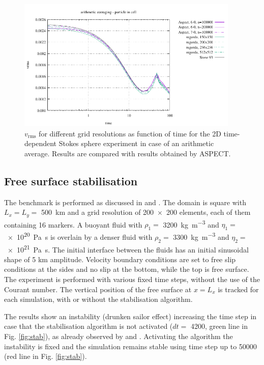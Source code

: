 \documentclass[hidelinks,10pt,a4paper]{article}
\begin{document}
\begin{figure}
\centering
\noindent\includegraphics[width=400px]{./Figures/vrms_arithm.pdf}
\caption{$v_{\textrm{rms}}$ for different grid resolutions as function of time for the 2D time-dependent Stokes sphere experiment in case of an arithmetic average.
Results are compared with results obtained by ASPECT.}
\label{fig:inst_spherefs}
\end{figure}

\subsection{Free surface stabilisation}\label{sec:stab}
The benchmark is performed as discussed in \citet{Kaus2010a} and \citet{Thieulot2014}. The domain is square with $L_x=L_y=$ \SI{500}{\km} and a grid resolution
of \num{200x200} elements, each of them containing 16 markers. A buoyant fluid with $\rho_1=$ \SI{3200}{\kg\per\cubic\metre} and $\eta_1=$ \SI{e20}{\pascal\s}
is overlain by a denser fluid with $\rho_2=$ \SI{3300}{\kg\per\cubic\metre} and $\eta_2=$ \SI{e21}{\pascal\s}. The initial interface between the fluids has an
initial sinusoidal shape of 5 km amplitude. Velocity boundary conditions are set to free slip conditions at the sides and no slip at the bottom, while the top
is free surface. The experiment is performed with various fixed time steps, without the use of the Courant number. The vertical position of the free surface at
$x=L_x$ is tracked for each simulation, with or without the stabilisation algorithm.

The results show an instability (drunken sailor effect) increasing the time step in case that the stabilisation algorithm is not activated
($dt=$ \SI{4200}{\year}, green line in Fig. \ref{fig:stab}), as already observed by \citet{Kaus2010a} and \citet{Thieulot2014}. Activating the algorithm the
instability is fixed and the simulation remains stable using time step up to \SI{50000}{\year} (red line in Fig. \ref{fig:stab}).
\end{document}

